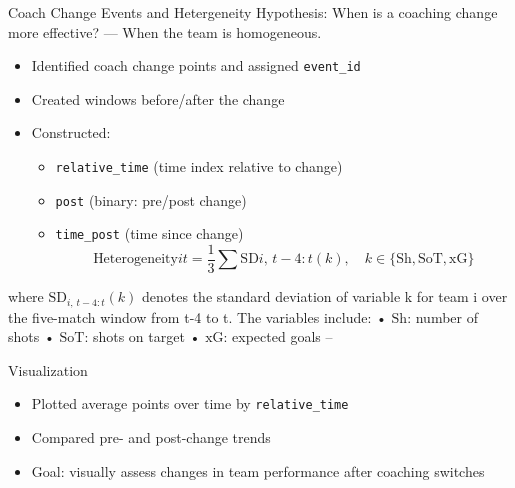 \documentclass[
  ignorenonframetext,
]{beamer}
\providecommand{\tightlist}{%
  \setlength{\itemsep}{0pt}\setlength{\parskip}{0pt}}\usepackage{longtable,booktabs,array}
\begin{document}
\begin{frame}[fragile]{Coach Change Events and Hetergeneity}
\label{coach-change-events-and-hetergeneity}
Hypothesis: When is a coaching change more effective? --- When the team
is homogeneous.

\begin{itemize}
\tightlist
\item
  Identified coach change points and assigned \texttt{event\_id}
\item
  Created windows before/after the change
\item
  Constructed:

  \begin{itemize}
  \tightlist
  \item
    \texttt{relative\_time} (time index relative to change)
  \item
    \texttt{post} (binary: pre/post change)
  \item
    \texttt{time\_post} (time since change)
    \[\text{Heterogeneity}{it} = \frac{1}{3} \sum \text{SD}{i,\,t-4:t}(k), \quad k \in \{\text{Sh}, \text{SoT}, \text{xG}\}\]
  \end{itemize}
\end{itemize}

where \(\text{SD}_{i,\,t-4:t}(k)\) denotes the standard deviation of
variable k for team i over the five-match window from t-4 to t. The
variables include: • \(\text{Sh}\): number of shots • \(\text{SoT}\):
shots on target • \(\text{xG}\): expected goals --
\end{frame}

\begin{frame}[fragile]{Visualization}
\label{visualization}
\begin{itemize}
\tightlist
\item
  Plotted average points over time by \texttt{relative\_time}
\item
  Compared pre- and post-change trends
\item
  Goal: visually assess changes in team performance after coaching
  switches
\end{itemize}
\end{frame}
\end{document}
